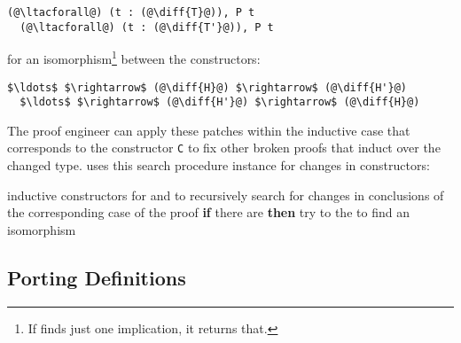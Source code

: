 \begin{lstlisting}[language=coq]
  (@\ltacforall@) (t : (@\diff{T}@)), P t
  (@\ltacforall@) (t : (@\diff{T'}@)), P t
\end{lstlisting}
for an isomorphism\footnote{If \sysname finds just one implication, it returns that.} between the constructors:

\begin{lstlisting}[language=coq]
  $\ldots$ $\rightarrow$ (@\diff{H}@) $\rightarrow$ (@\diff{H'}@)
  $\ldots$ $\rightarrow$ (@\diff{H'}@) $\rightarrow$ (@\diff{H}@)
\end{lstlisting}
The proof engineer can apply these patches within the inductive case that corresponds to the constructor \lstinline{C}
to fix other broken proofs that induct over the changed type. 
\sysname uses this search procedure instance for changes in constructors:

\begin{algorithm}
\footnotesize
\begin{algorithmic}[1]
    \STATE {} inductive constructors for 
    \STATE {} and  to recursively search for changes in conclusions of the corresponding case of the proof
    \STATE \textbf{if} there are  \textbf{then}
    \STATE \hspace*{1em} try to  the  to find an isomorphism 
\end{algorithmic}
\end{algorithm}

\subsection{Porting Definitions}
\label{sec:foundations}

